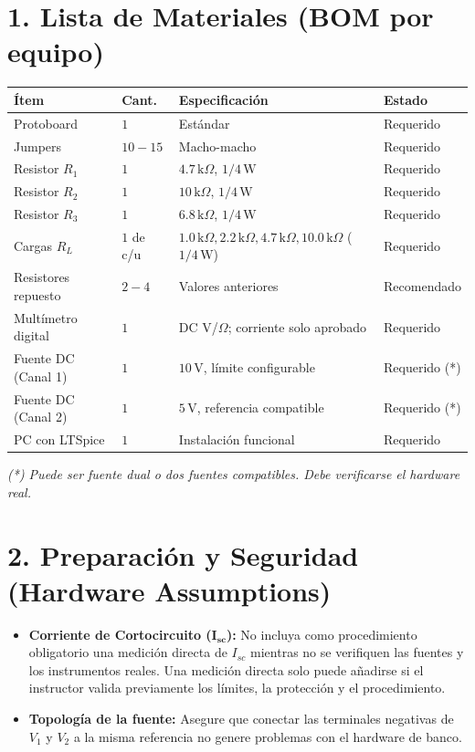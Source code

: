 \documentclass[11pt, a4paper]{article}
\begin{document}
\begin{tcolorbox}[colback=ucbblue!5!white, colframe=ucbblue, title=\textbf{Material del Instructor y BOM: Experiencia Integrada A (Valores Corregidos)}]
\end{tcolorbox}

\section*{1. Lista de Materiales (BOM por equipo)}
\renewcommand{\arraystretch}{1.3}
\noindent 
\begin{tabularx}{\textwidth}{|>{\RaggedRight}X|>{\centering\arraybackslash}p{1.5cm}|>{\RaggedRight}X|>{\RaggedRight}X|}
\hline
\rowcolor{ucbblue!10}\textbf{Ítem} & \textbf{Cant.} & \textbf{Especificación} & \textbf{Estado} \\ \hline
Protoboard & $1$ & Estándar & Requerido \\ \hline
Jumpers & $10-15$ & Macho-macho & Requerido \\ \hline
Resistor $R_1$ & $1$ & $4.7\,\text{k}\Omega$, $1/4\,\text{W}$ & Requerido \\ \hline
Resistor $R_2$ & $1$ & $10\,\text{k}\Omega$, $1/4\,\text{W}$ & Requerido \\ \hline
Resistor $R_3$ & $1$ & $6.8\,\text{k}\Omega$, $1/4\,\text{W}$ & Requerido \\ \hline
Cargas $R_L$ & $1$ de c/u & $1.0\,\text{k}\Omega, 2.2\,\text{k}\Omega, 4.7\,\text{k}\Omega, 10.0\,\text{k}\Omega$ ($1/4\,\text{W}$) & Requerido \\ \hline
Resistores repuesto & $2-4$ & Valores anteriores & Recomendado \\ \hline
Multímetro digital & $1$ & DC V/$\Omega$; corriente solo aprobado & Requerido \\ \hline
Fuente DC (Canal 1) & $1$ & $10\,\text{V}$, límite configurable & Requerido (*) \\ \hline
Fuente DC (Canal 2) & $1$ & $5\,\text{V}$, referencia compatible & Requerido (*) \\ \hline
PC con LTSpice & $1$ & Instalación funcional & Requerido \\ \hline
\end{tabularx}
\textit{(*) Puede ser fuente dual o dos fuentes compatibles. Debe verificarse el hardware real.}

\section*{2. Preparación y Seguridad (Hardware Assumptions)}
\begin{itemize}\setlength\itemsep{-0.1em}
    \item \textbf{Corriente de Cortocircuito ($\bm{I_{sc}}$):} No incluya como procedimiento obligatorio una medición directa de $I_{sc}$ mientras no se verifiquen las fuentes y los instrumentos reales. Una medición directa solo puede añadirse si el instructor valida previamente los límites, la protección y el procedimiento.
    \item \textbf{Topología de la fuente:} Asegure que conectar las terminales negativas de $V_1$ y $V_2$ a la misma referencia no genere problemas con el hardware de banco.
\end{itemize}
\end{document}
